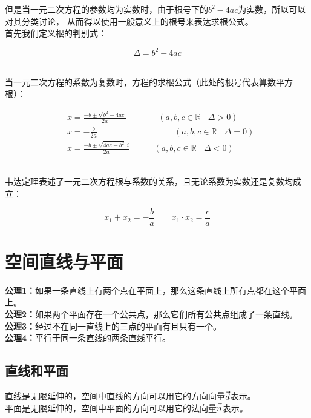 \documentclass[UTF8]{ctexart}
\let\nvec\vec
\def\vec#1{\nvec{\vphantom b\smash{#1}}}
\begin{document}
    但是当一元二次方程的参数均为实数时，由于根号下的$b^2-4ac$为实数，所以可以对其分类讨论，
    从而得以使用一般意义上的根号来表达求根公式。\\[3mm]
    首先我们定义根的判别式：
    \begin{large}
        \begin{equation*}
            \Delta=b^2-4ac
        \end{equation*}
    \end{large}\\
    当一元二次方程的系数为复数时，方程的求根公式（此处的根号代表算数平方根）：\vspace{15pt}
    \begin{large}
        \begin{align*}
            &x=\frac{-b\pm\sqrt{b^2-4ac}}{2a}~~~~~~~~\qquad(a,b,c\in\mathbb{R}~~~~\Delta>0)\\[6mm]
            &x=-\frac{b}{2a}\qquad\qquad\qquad\qquad~~~~\:(a,b,c\in\mathbb{R}~~~~\Delta=0)\\[6mm]
            &x=\frac{-b\pm\sqrt{4ac-b^2}~i}{2a}\qquad~~~~(a,b,c\in\mathbb{R}~~~~\Delta<0)
        \end{align*}
    \end{large}\\[1mm]
    韦达定理表述了一元二次方程根与系数的关系，且无论系数为实数还是复数均成立：\vspace{10pt}
    \begin{large}
        \begin{equation*}
            x_1+x_2=-\frac{b}{a}\qquad x_1\cdot x_2=\frac{c}{a}
        \end{equation*}
    \end{large}    

\newpage

\section{空间直线与平面}
    \textbf{公理1：}如果一条直线上有两个点在平面上，那么这条直线上所有点都在这个平面上。\\[3mm]
    \textbf{公理2：}如果两个平面存在一个公共点，那么它们所有公共点组成了一条直线。\\[3mm]
    \textbf{公理3：}经过不在同一直线上的三点的平面有且只有一个。\\[3mm]
    \textbf{公理4：}平行于同一条直线的两条直线平行。

\subsection{直线和平面}
    直线是无限延伸的，空间中直线的方向可以用它的方向向量$\vec{d}$表示。\\[3mm]
    平面是无限延伸的，空间中平面的方向可以用它的法向量$\vec{n}$表示。
\end{document}
